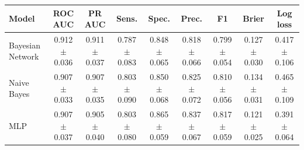 \begin{tabular}{lcccccccc}
\toprule
Model & ROC AUC & PR AUC & Sens. & Spec. & Prec. & F1 & Brier & Log loss \\
\midrule
Bayesian Network & 0.912 $\pm$ 0.036 & 0.911 $\pm$ 0.037 & 0.787 $\pm$ 0.083 & 0.848 $\pm$ 0.065 & 0.818 $\pm$ 0.066 & 0.799 $\pm$ 0.054 & 0.127 $\pm$ 0.030 & 0.417 $\pm$ 0.106 \\
Naive Bayes & 0.907 $\pm$ 0.033 & 0.907 $\pm$ 0.035 & 0.803 $\pm$ 0.090 & 0.850 $\pm$ 0.068 & 0.825 $\pm$ 0.072 & 0.810 $\pm$ 0.056 & 0.134 $\pm$ 0.031 & 0.465 $\pm$ 0.109 \\
MLP & 0.907 $\pm$ 0.037 & 0.905 $\pm$ 0.040 & 0.803 $\pm$ 0.080 & 0.865 $\pm$ 0.059 & 0.837 $\pm$ 0.067 & 0.817 $\pm$ 0.059 & 0.121 $\pm$ 0.025 & 0.391 $\pm$ 0.064 \\
\bottomrule
\end{tabular}
